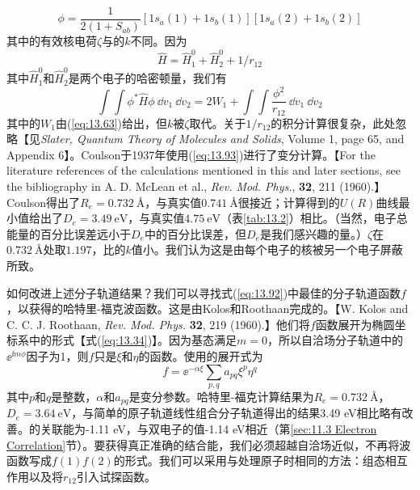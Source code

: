     \begin{equation}
        \phi = \frac{1}{2\left(1 + S_{ab}\right)}\left[1s_a\left(1\right) + 1s_b\left(1\right)\right]\left[1s_a\left(2\right) + 1s_b\left(2\right)\right]
        \label{eq:13.94}
    \end{equation}
    其中的有效核电荷$\zeta$与的$k$不同。因为
    \begin{equation*}
        \hat{H} = \hat{H}_1^0 + \hat{H}_2^0 + {1}/{r_{12}}
    \end{equation*}
    其中$\hat{H}_1^0$和$\hat{H}_2^0$是两个电子的哈密顿量，我们有
    \begin{equation*}
        \int \int \phi^* \hat{H} \phi \:\dd v_1\:\dd v_2 = 2W_1 + \int \int \frac{\phi^2}{r_{12}} \:\dd v_1\:\dd v_2
    \end{equation*}
    其中的$W_1$由(\ref{eq:13.63})给出，但$k$被$\zeta$取代。关于$1/r_{12}$的积分计算很复杂，此处忽略【见\textit{Slater, Quantum Theory of Molecules and Solids}, Volume 1, page 65, and Appendix 6】。Coulson于1937年使用(\ref{eq:13.93})进行了变分计算。【For the literature references of the  calculations mentioned in this and later sections, see the bibliography in A. D. McLean et al., \textit{Rev. Mod. Phys.}, \textbf{32}, 211 (1960).】Coulson得出了$R_e = 0.732\:\mathrm{Å}$，与真实值$0.741\:\mathrm{Å}$很接近；计算得到的$U\left(R\right)$曲线最小值给出了$D_e = 3.49\:\mathrm{eV}$，与真实值$4.75\:\mathrm{eV}$（表\ref{tab:13.2}）相比。（当然，电子总能量的百分比误差远小于$D_e$中的百分比误差，但$D_e$是我们感兴趣的量。）$\zeta$在$0.732\:\mathrm{Å}$处取$1.197$，比的$k$值小。我们认为这是由每个电子的核被另一个电子屏蔽所致。

    如何改进上述分子轨道结果？我们可以寻找式(\ref{eq:13.92})中最佳的分子轨道函数$f$，以获得的哈特里-福克波函数。这是由Kolos和Roothaan完成的。【W. Kolos and C. C. J. Roothaan, \textit{Rev. Mod. Phys.} \textbf{32}, 219 (1960).】他们将$f$函数展开为椭圆坐标系中的形式【式(\ref{eq:13.34})】。因为基态满足$m=0$，所以自洽场分子轨道中的$\ee ^{\ii m\phi}$因子为1，则$f$只是$\xi$和$\eta$的函数。使用的展开式为
    \begin{equation*}
        f = \ee ^{-\alpha\xi} \sum_{p,q}a_{pq} \xi^p \eta^{q}
    \end{equation*}
    其中$p$和$q$是整数，$\alpha$和$a_{pq}$是变分参数。哈特里-福克计算结果为$R_e = 0.732\:\mathrm{Å}$，$D_e = 3.64\:\mathrm{eV}$，与简单的原子轨道线性组合分子轨道得出的结果3.49 eV相比略有改善。的关联能为-1.11 eV，与双电子的值-1.14 eV相近（第\ref{sec:11.3 Electron Correlation}节）。要获得真正准确的结合能，我们必须超越自洽场近似，不再将波函数写成$f\left(1\right)f\left(2\right)$的形式。我们可以采用与处理原子时相同的方法：组态相互作用以及将$r_{12}$引入试探函数。

